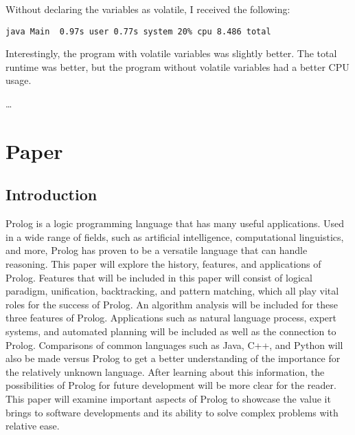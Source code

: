 \documentclass{article}
\theoremstyle{theorem}
\theoremstyle{definition}
\theoremstyle{remark}
\begin{document}
\noindent\newline Without declaring the variables as volatile, I received the following:
\begin{verbatim}
java Main  0.97s user 0.77s system 20% cpu 8.486 total
\end{verbatim}

\noindent\newline\newline Interestingly, the program with volatile variables was slightly better. The total runtime was better, but the program without volatile variables had a better CPU usage.


\dots

\section{Paper}
\subsection{Introduction}

Prolog is a logic programming language that has many useful applications. Used in a wide range of fields, such as artificial intelligence, computational linguistics, and more, Prolog has proven to be a versatile language that can handle reasoning. This paper will explore the history, features, and applications of Prolog. Features that will be included in this paper will consist of logical paradigm, unification, backtracking, and pattern matching, which all play vital roles for the success of Prolog. An algorithm analysis will be included for these three features of Prolog. Applications such as natural language process, expert systems, and automated planning will be included as well as the connection to Prolog. Comparisons of common languages such as Java, C++, and Python will also be made versus Prolog to get a better understanding of the importance for the relatively unknown language. After learning about this information, the possibilities of Prolog for future development will be more clear for the reader. This paper will examine important aspects of Prolog to showcase the value it brings to software developments and its ability to solve complex problems with relative ease.\newline
\end{document}
